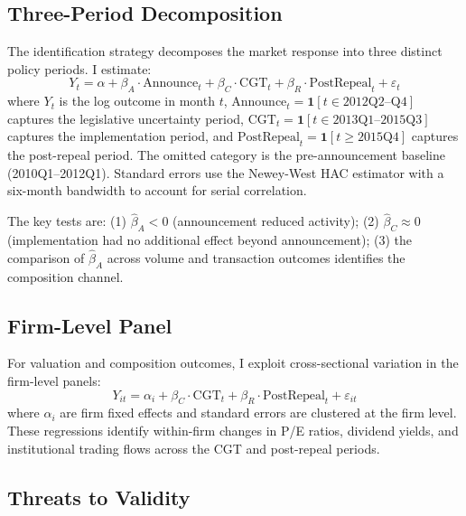 \documentclass[12pt]{article}
\begin{document}
\subsection{Three-Period Decomposition}

The identification strategy decomposes the market response into three distinct policy periods. I estimate:
\begin{equation}\label{eq:main}
Y_t = \alpha + \beta_A \cdot \text{Announce}_t + \beta_C \cdot \text{CGT}_t + \beta_R \cdot \text{PostRepeal}_t + \varepsilon_t
\end{equation}
where $Y_t$ is the log outcome in month $t$, $\text{Announce}_t = \mathbf{1}[t \in \text{2012Q2--Q4}]$ captures the legislative uncertainty period, $\text{CGT}_t = \mathbf{1}[t \in \text{2013Q1--2015Q3}]$ captures the implementation period, and $\text{PostRepeal}_t = \mathbf{1}[t \geq \text{2015Q4}]$ captures the post-repeal period. The omitted category is the pre-announcement baseline (2010Q1--2012Q1). Standard errors use the \citet{rambachan2023more} Newey-West HAC estimator with a six-month bandwidth to account for serial correlation.

The key tests are: (1) $\hat{\beta}_A < 0$ (announcement reduced activity); (2) $\hat{\beta}_C \approx 0$ (implementation had no additional effect beyond announcement); (3) the comparison of $\hat{\beta}_A$ across volume and transaction outcomes identifies the composition channel.

\subsection{Firm-Level Panel}

For valuation and composition outcomes, I exploit cross-sectional variation in the firm-level panels:
\begin{equation}\label{eq:panel}
Y_{it} = \alpha_i + \beta_C \cdot \text{CGT}_t + \beta_R \cdot \text{PostRepeal}_t + \varepsilon_{it}
\end{equation}
where $\alpha_i$ are firm fixed effects and standard errors are clustered at the firm level. These regressions identify within-firm changes in P/E ratios, dividend yields, and institutional trading flows across the CGT and post-repeal periods.

\subsection{Threats to Validity}
\end{document}
